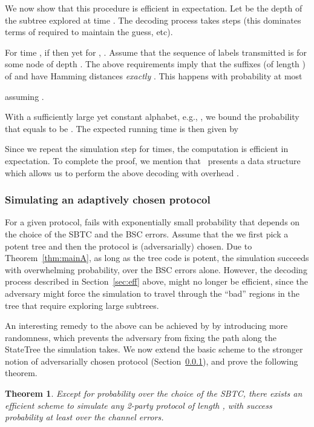 \documentclass[ letterpaper, 11pt]{article}
\newtheorem{theorem}{Theorem}[section]
\newcommand{\statetree}{{\textsf{StateTree}}\xspace}
\newcommand{\potent}{potent\xspace}
\newcommand{\KTC}{\textsf{SBTC}\xspace}
\begin{document}
We now show that this procedure is efficient in expectation.
Let  be the depth of the subtree explored at time .
The decoding process takes   steps
(this dominates terms of   required to maintain the guess, etc).

For time , if  then 
yet for , . Assume that the
sequence of labels transmitted is  for some node  of depth .
The above requirements imply that the suffixes (of length )
of  and  have Hamming distances \emph{exactly} .
This happens with probability at most

assuming .

With a sufficiently large yet constant alphabet, e.g.,  ,
we bound
the probability that  equals  to be .
The expected running time is then given by

Since we repeat the simulation step for   times,
the computation is efficient in expectation.
To complete the proof, we mention that~\cite{schulman96} presents  a data structure
which allows us to perform the above decoding with overhead .



\subsubsection{Simulating an adaptively chosen protocol}\label{sec:adaptive}




For a given protocol,   fails with exponentially small probability that
depends on the choice of the \KTC and the BSC errors.
Assume that the we first pick a \potent tree
and then the protocol  is (adversarially) chosen.
Due to Theorem~\ref{thm:mainA}, as long as the tree code is  \potent,
the simulation succeeds with overwhelming probability, over the
BSC errors alone. However, the decoding process described in
Section~\ref{sec:eff} above, might no longer be efficient,
since the adversary might force the simulation
to travel through the ``bad'' regions in the tree that require exploring large subtrees.

An interesting remedy to the above
can be achieved by
by introducing more randomness,
which prevents the adversary from fixing the path along the \statetree the simulation takes.
We now extend  the basic scheme 
to the stronger notion
of adversarially chosen protocol (Section~\ref{sec:adaptive}), and prove the following theorem.
\begin{theorem}\label{thm:mainAdaptive}
Except for probability  over the choice of the \KTC, there exists
an efficient scheme to simulate any 2-party protocol 
of length , with success probability at least  over the channel errors.
\end{theorem}
\end{document}
